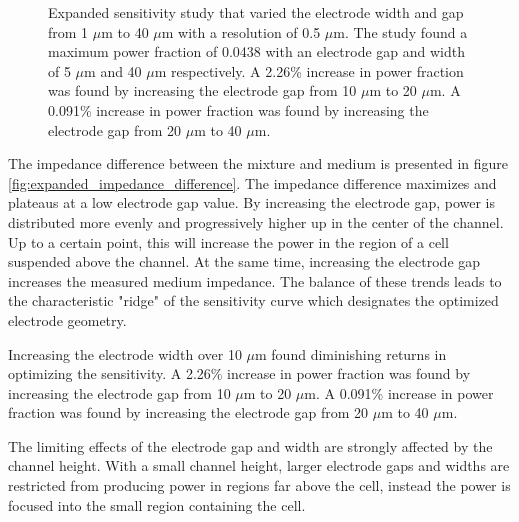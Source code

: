 \begin{figure}[h]
\begin{subfigure}[b]{0.49\textwidth}
    \end{subfigure}
    \caption[Expanded power fraction sensitivity study.]{Expanded sensitivity study that varied the electrode width and gap from 1 $\mu$m to 40 $\mu$m with a resolution of 0.5 $\mu$m. The study found a maximum power fraction of 0.0438 with an electrode gap and width of 5 $\mu$m  and 40 $\mu$m  respectively. A 2.26\% increase in power fraction was found by increasing the electrode gap from 10 $\mu$m to 20 $\mu$m. A 0.091\% increase in power fraction was found by increasing the electrode gap from 20 $\mu$m to 40 $\mu$m.}
    \label{fig:expanded_power_sensitivity} 
\end{figure}

\par The impedance difference between the mixture and medium is presented in figure \ref{fig:expanded_impedance_difference}. The impedance difference maximizes and plateaus at a low electrode gap value. By increasing the electrode gap, power is distributed more evenly and progressively higher up in the center of the channel. Up to a certain point, this will increase the power in the region of a cell suspended above the channel. At the same time, increasing the electrode gap increases the measured medium impedance. The balance of these trends leads to the characteristic "ridge" of the sensitivity curve which designates the optimized electrode geometry.

\par  Increasing the electrode width over 10 $\mu$m found diminishing returns in optimizing the sensitivity. A 2.26\% increase in power fraction was found by increasing the electrode gap from 10 $\mu$m to 20 $\mu$m. A 0.091\% increase in power fraction was found by increasing the electrode gap from 20 $\mu$m to 40 $\mu$m.

\par The limiting effects of the electrode gap and width are strongly affected by the channel height. With a small channel height, larger electrode gaps and widths are restricted from producing power in regions far above the cell, instead the power is focused into the small region containing the cell. 

